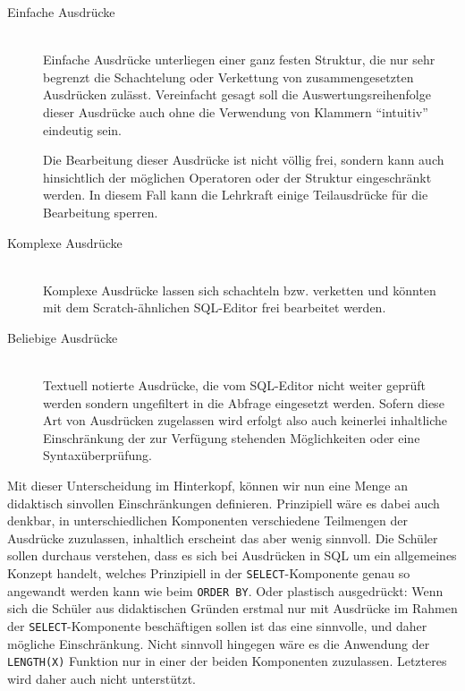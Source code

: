 \begin{description}
\item[Einfache Ausdrücke] \hfill\\
  Einfache Ausdrücke unterliegen einer ganz festen Struktur, die nur sehr begrenzt die Schachtelung oder Verkettung von zusammengesetzten Ausdrücken zulässt. Vereinfacht gesagt soll die Auswertungsreihenfolge dieser Ausdrücke auch ohne die Verwendung von Klammern ``intuitiv'' eindeutig sein.
  
  Die Bearbeitung dieser Ausdrücke ist nicht völlig frei, sondern kann auch hinsichtlich der möglichen Operatoren oder der Struktur eingeschränkt werden. In diesem Fall kann die Lehrkraft einige Teilausdrücke für die Bearbeitung sperren.
\item[Komplexe Ausdrücke] \hfill\\
  Komplexe Ausdrücke lassen sich schachteln bzw. verketten und könnten mit dem Scratch-ähnlichen SQL-Editor frei bearbeitet werden.
\item[Beliebige Ausdrücke] \hfill\\
  Textuell notierte Ausdrücke, die vom SQL-Editor nicht weiter geprüft werden sondern ungefiltert in die Abfrage eingesetzt werden. Sofern diese Art von Ausdrücken zugelassen wird erfolgt also auch keinerlei inhaltliche Einschränkung der zur Verfügung stehenden Möglichkeiten oder eine Syntaxüberprüfung.
\end{description}

Mit dieser Unterscheidung im Hinterkopf, können wir nun eine Menge an didaktisch sinvollen Einschränkungen definieren. Prinzipiell wäre es dabei auch denkbar, in unterschiedlichen Komponenten verschiedene Teilmengen der Ausdrücke zuzulassen, inhaltlich erscheint das aber wenig sinnvoll. Die Schüler sollen durchaus verstehen, dass es sich bei Ausdrücken in SQL um ein allgemeines Konzept handelt, welches Prinzipiell in der \texttt{SELECT}-Komponente genau so angewandt werden kann wie beim \texttt{ORDER BY}. Oder plastisch ausgedrückt: Wenn sich die Schüler aus didaktischen Gründen erstmal nur mit Ausdrücke im Rahmen der \texttt{SELECT}-Komponente beschäftigen sollen ist das eine sinnvolle, und daher mögliche Einschränkung. Nicht sinnvoll hingegen wäre es die Anwendung der \texttt{LENGTH(X)} Funktion nur in einer der beiden Komponenten zuzulassen. Letzteres wird daher auch nicht unterstützt.

